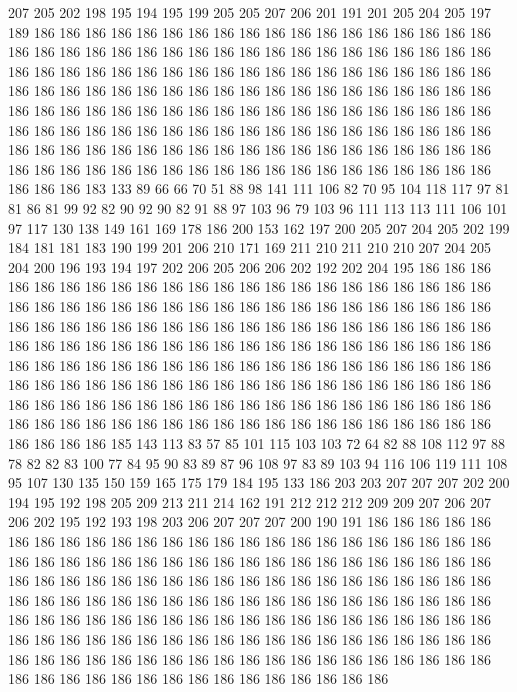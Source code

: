 207 205 202 198 195 194 195 199 205 205 207 206 201 191 201 205 204 205 197 189
186 186 186 186 186 186 186 186 186 186 186 186 186 186 186 186 186 186 186 186
186 186 186 186 186 186 186 186 186 186 186 186 186 186 186 186 186 186 186 186
186 186 186 186 186 186 186 186 186 186 186 186 186 186 186 186 186 186 186 186
186 186 186 186 186 186 186 186 186 186 186 186 186 186 186 186 186 186 186 186
186 186 186 186 186 186 186 186 186 186 186 186 186 186 186 186 186 186 186 186
186 186 186 186 186 186 186 186 186 186 186 186 186 186 186 186 186 186 186 186
186 186 186 186 186 186 186 186 186 186 186 186 186 186 186 186 186 186 186 186
186 186 186 186 186 186 186 186 186 186 186 186 186 186 183 133 89 66 66 70
51 88 98 141 111 106 82 70 95 104 118 117 97 81 81 86 81 99 92 82
90 92 90 82 91 88 97 103 96 79 103 96 111 113 113 111 106 101 97 117
130 138 149 161 169 178 186 200 153 162 197 200 205 207 204 205 202 199 184 181
181 183 190 199 201 206 210 171 169 211 210 211 210 210 207 204 205 204 200 196
193 194 197 202 206 205 206 206 202 192 202 204 195 186 186 186 186 186 186 186
186 186 186 186 186 186 186 186 186 186 186 186 186 186 186 186 186 186 186 186
186 186 186 186 186 186 186 186 186 186 186 186 186 186 186 186 186 186 186 186
186 186 186 186 186 186 186 186 186 186 186 186 186 186 186 186 186 186 186 186
186 186 186 186 186 186 186 186 186 186 186 186 186 186 186 186 186 186 186 186
186 186 186 186 186 186 186 186 186 186 186 186 186 186 186 186 186 186 186 186
186 186 186 186 186 186 186 186 186 186 186 186 186 186 186 186 186 186 186 186
186 186 186 186 186 186 186 186 186 186 186 186 186 186 186 186 186 186 186 186
186 186 186 186 186 186 186 186 186 186 186 186 185 143 113 83 57 85 101 115
103 103 72 64 82 88 108 112 97 88 78 82 82 83 100 77 84 95 90 83
89 87 96 108 97 83 89 103 94 116 106 119 111 108 95 107 130 135 150 159
165 175 179 184 195 133 186 203 203 207 207 207 202 200 194 195 192 198 205 209
213 211 214 162 191 212 212 212 209 209 207 206 207 206 202 195 192 193 198 203
206 207 207 207 200 190 191 186 186 186 186 186 186 186 186 186 186 186 186 186
186 186 186 186 186 186 186 186 186 186 186 186 186 186 186 186 186 186 186 186
186 186 186 186 186 186 186 186 186 186 186 186 186 186 186 186 186 186 186 186
186 186 186 186 186 186 186 186 186 186 186 186 186 186 186 186 186 186 186 186
186 186 186 186 186 186 186 186 186 186 186 186 186 186 186 186 186 186 186 186
186 186 186 186 186 186 186 186 186 186 186 186 186 186 186 186 186 186 186 186
186 186 186 186 186 186 186 186 186 186 186 186 186 186 186 186 186 186 186 186
186 186 186 186 186 186 186 186 186 186 186 186 186 186 186 186 186 186 186 186
